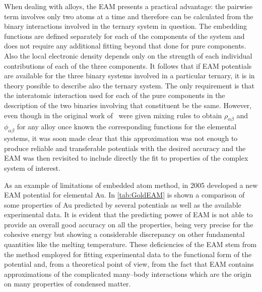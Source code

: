 When dealing with alloys, the EAM presents a practical advantage: the pairwise term involves only two atoms at a time and therefore can be calculated from the binary interactions involved in the ternary system in question. The embedding functions are defined separately for each of the components of the system and does not require any additional fitting beyond that done for pure components. Also the local electronic density depends only on the strength of each individual contributions of each of the three components. It follows that if EAM potentials are available for the three binary systems involved in a particular ternary, it is in theory possible to describe also the ternary system. The only requirement is that the interatomic interaction used for each of the pure components in the description of the two binaries involving that constituent be the same. However, even though in the original work of~\textcite{Daw1984EAM} were given mixing rules to obtain $\rho_{\alpha\beta}$ and $\phi_{\alpha\beta}$ for any alloy once known the corresponding functions for the elemental systems, it was soon made clear that this approximation was not enough to produce reliable and transferable potentials with the desired accuracy and the EAM was then revisited to include directly the fit to properties of the complex system of interest.

As an example of limitations of embedded atom method, \textcite{Grochola2005} in 2005 developed a new EAM potential for elemental Au. In \cref{tab:GoldEAM} is shown a comparison of some properties of Au predicted by several potentials as well as the available experimental data. It is evident that the predicting power of EAM is not able to provide an overall good accuracy on all the properties, being very precise for the cohesive energy but showing a considerable discrepancy on other fundamental quantities like the melting temperature. These deficiencies of the EAM stem from the method employed for fitting experimental data to the functional form of the potential and, from a theoretical point of view, from the fact that EAM contains approximations of the complicated many--body interactions which are the origin on many properties of condensed matter.


